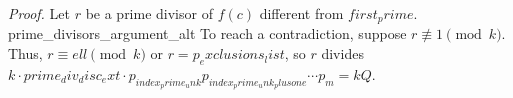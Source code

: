 \textit{Proof.} Let $r$ be a prime divisor of $f(c)$ different from ${first_prime}$. {prime_divisors_argument_alt} To reach a contradiction, suppose $r\not\equiv 1\pmod{{k}}$. Thus, $r\equiv {ell}\pmod{{k}}$ or $r={p_exclusions_list}$, so $r$ divides ${k}\cdot{prime_div_disc_ext}\cdot p_{{index_prime_unk}}p_{{index_prime_unk_plusone}}\cdots p_m={k}Q$.
